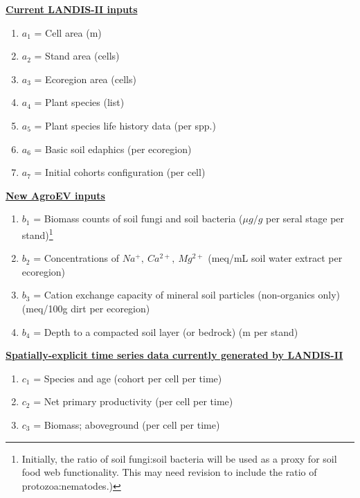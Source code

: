 \noindent \textbf{\underline{Current LANDIS-II inputs}}
\begin{enumerate}
  \item $a_1$ = Cell area (m)
  \item $a_2$ = Stand area (cells)
  \item $a_3$ = Ecoregion area (cells)
  \item $a_4$ = Plant species  (list)
  \item $a_5$ = Plant species life history data (per spp.)
  \item $a_6$ = Basic soil edaphics (per ecoregion)
  \item $a_7$ = Initial cohorts configuration (per cell)
\end{enumerate}

\vspace{5 mm}
\newpage
\noindent \textbf{\underline{New AgroEV inputs}}
\begin{enumerate}
  \item $b_1$ = Biomass counts of soil fungi and soil bacteria ($\mu g / g$ per seral stage per stand)\footnote{Initially, the ratio of soil fungi:soil bacteria will be used as a proxy for soil food web functionality. This may need revision to include the ratio of protozoa:nematodes.)} 
  \item $b_2$ = Concentrations of $Na^{+}, \ Ca^{2+}, \ Mg^{2+}$ (meq/mL soil water extract per ecoregion)
  \item $b_3$ = Cation exchange capacity of mineral soil particles (non-organics only) (meq/100g dirt per ecoregion)
  \item $b_4$ = Depth to a compacted soil layer (or bedrock) (m per stand)
\end{enumerate}

\vspace{5 mm}

\noindent \textbf{\underline{Spatially-explicit time series data currently generated by LANDIS-II}}

\begin{enumerate}
  \item $c_1$ = Species and age (cohort per cell per time)
  \item $c_2$ = Net primary productivity (per cell per time)
  \item $c_3$ = Biomass; aboveground (per cell per time)
\end{enumerate}


